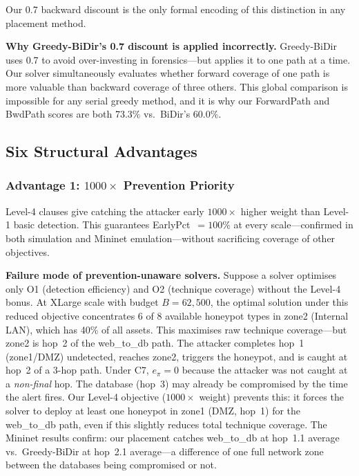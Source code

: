 \documentclass[journal]{IEEEtran}
\begin{document}
Our 0.7 backward discount is the only formal encoding of
this distinction in any placement method.

\begin{insightbox}
\textbf{Why Greedy-BiDir's 0.7 discount is applied
incorrectly.}
Greedy-BiDir uses 0.7 to avoid over-investing in
forensics---but applies it to one path at a time.
Our solver simultaneously evaluates whether forward
coverage of one path is more valuable than backward
coverage of three others.
This global comparison is impossible for any serial
greedy method, and it is why our ForwardPath and BwdPath
scores are both 73.3\% vs.\ BiDir's 60.0\%.
\end{insightbox}

\subsection{Six Structural Advantages}

\subsubsection{Advantage 1: $1000\times$ Prevention Priority}

Level-4 clauses give catching the attacker early $1000\times$
higher weight than Level-1 basic detection.
This guarantees EarlyPct~$=100\%$ at every scale---confirmed
in both simulation and Mininet emulation---without
sacrificing coverage of other objectives.

\begin{examplebox}
\textbf{Failure mode of prevention-unaware solvers.}
Suppose a solver optimises only O1 (detection efficiency)
and O2 (technique coverage) without the Level-4 bonus.
At XLarge scale with budget $B=62{,}500$, the optimal
solution under this reduced objective concentrates 6 of 8
available honeypot types in zone2 (Internal LAN), which
has 40\% of all assets.
This maximises raw technique coverage---but zone2 is
hop~2 of the web\_to\_db path.
The attacker completes hop~1 (zone1/DMZ) undetected,
reaches zone2, triggers the honeypot, and is caught at
hop~2 of a 3-hop path.
Under C7, $e_\pi=0$ because the attacker was not caught
at a \emph{non-final} hop.
The database (hop~3) may already be compromised by the
time the alert fires.
Our Level-4 objective ($1000\times$ weight) prevents this:
it forces the solver to deploy at least one honeypot in
zone1 (DMZ, hop~1) for the web\_to\_db path, even if
this slightly reduces total technique coverage.
The Mininet results confirm: our placement catches
web\_to\_db at hop~1.1 average vs.\ Greedy-BiDir at
hop~2.1 average---a difference of one full network zone
between the databases being compromised or not.
\end{examplebox}
\end{document}
